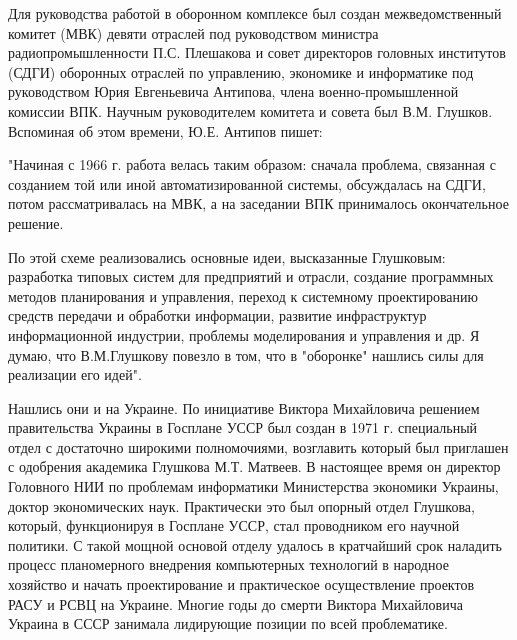 \documentclass{article}
\begin{document}
Для руководства работой в оборонном комплексе был создан межведомственный
комитет (МВК) девяти отраслей под руководством министра радиопромышленности П.С.
Плешакова и совет директоров головных институтов (СДГИ) оборонных отраслей по
управлению, экономике и информатике под руководством Юрия Евгеньевича Антипова,
члена военно-промышленной комиссии ВПК. Научным руководителем комитета и совета
был В.М. Глушков. Вспоминая об этом времени, Ю.Е. Антипов пишет:

"Начиная с 1966 г. работа велась таким образом: сначала проблема, связанная с
созданием той или иной автоматизированной системы, обсуждалась на СДГИ, потом
рассматривалась на МВК, а на заседании ВПК принималось окончательное решение.

По этой схеме реализовались основные идеи, высказанные Глушковым: разработка
типовых систем для предприятий и отрасли, создание программных методов
планирования и управления, переход к системному проектированию средств передачи
и обработки информации, развитие инфраструктур информационной индустрии,
проблемы моделирования и управления и др. Я думаю, что В.М.Глушкову повезло в
том, что в "оборонке" нашлись силы для реализации его идей".

Нашлись они и на Украине. По инициативе Виктора Михайловича решением
правительства Украины в Госплане УССР был создан в 1971 г. специальный отдел с
достаточно широкими полномочиями, возглавить который был приглашен с одобрения
академика Глушкова М.Т. Матвеев. В настоящее время он директор Головного НИИ по
проблемам информатики Министерства экономики Украины, доктор экономических наук.
Практически это был опорный отдел Глушкова, который, функционируя в Госплане
УССР, стал проводником его научной политики. С такой мощной основой отделу
удалось в кратчайший срок наладить процесс планомерного внедрения компьютерных
технологий в народное хозяйство и начать проектирование и практическое
осуществление проектов РАСУ и РСВЦ на Украине. Многие годы до смерти Виктора
Михайловича Украина в СССР занимала лидирующие позиции по всей проблематике.
\end{document}
